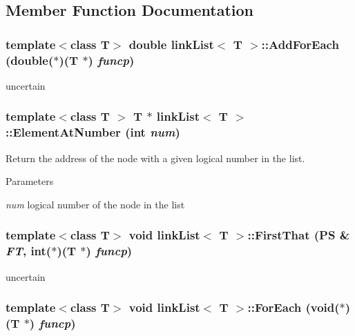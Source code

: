 \subsection{Member Function Documentation}
\hypertarget{classlink_list_a8e4653b41b17f8b5be54c8875740fd03}{
\subsubsection[{AddForEach}]{\setlength{\rightskip}{0pt plus 5cm}template$<$class T$>$ double {\bf linkList}$<$ T $>$::AddForEach (double($\ast$)(T $\ast$) {\em funcp})}}
\label{classlink_list_a8e4653b41b17f8b5be54c8875740fd03}


uncertain \hypertarget{classlink_list_a5735a6e54a2eed841bdf1fdb52aed03f}{
\subsubsection[{ElementAtNumber}]{\setlength{\rightskip}{0pt plus 5cm}template$<$class T $>$ T $\ast$ {\bf linkList}$<$ T $>$::ElementAtNumber (int {\em num})}}
\label{classlink_list_a5735a6e54a2eed841bdf1fdb52aed03f}


Return the address of the node with a given logical number in the list. 
\begin{DoxyParams}{Parameters}
\item[{\em num}]logical number of the node in the list \end{DoxyParams}
\hypertarget{classlink_list_ad83267f2c76e7bda04cdd0dd340d9b4f}{
\subsubsection[{FirstThat}]{\setlength{\rightskip}{0pt plus 5cm}template$<$class T$>$ void {\bf linkList}$<$ T $>$::FirstThat ({\bf PS} \& {\em FT}, \/  int($\ast$)(T $\ast$) {\em funcp})}}
\label{classlink_list_ad83267f2c76e7bda04cdd0dd340d9b4f}


uncertain \hypertarget{classlink_list_aa6f33a7774747239eff96ae4c55b4b68}{
\subsubsection[{ForEach}]{\setlength{\rightskip}{0pt plus 5cm}template$<$class T$>$ void {\bf linkList}$<$ T $>$::ForEach (void($\ast$)(T $\ast$) {\em funcp})}}
\label{classlink_list_aa6f33a7774747239eff96ae4c55b4b68}



